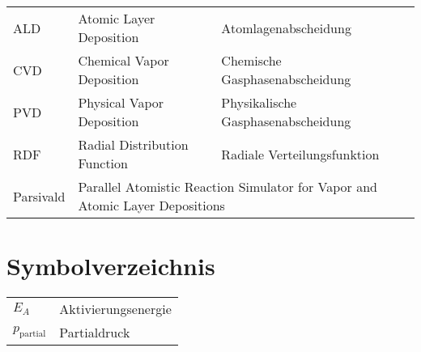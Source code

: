 \def\arraystretch{1.5}
\begin{tabularx}{\linewidth}{lll}
ALD	&	Atomic Layer Deposition	&	Atomlagenabscheidung	\\
CVD	&	Chemical Vapor Deposition	&	Chemische Gasphasenabscheidung	\\
PVD	&	Physical Vapor Deposition	&	Physikalische Gasphasenabscheidung	\\
RDF	&	Radial Distribution Function	&	Radiale Verteilungsfunktion	\\
Parsivald	&	\multicolumn{2}{X}{Parallel Atomistic Reaction Simulator for Vapor and Atomic Layer Depositions}	\\
\end{tabularx}

%
%


\chapter*{Symbolverzeichnis}
\def\listacronymname{Symbolverzeichnis}

\begin{tabularx}{\linewidth}{ll}
$E_A$ & Aktivierungsenergie \\
$p_\text{partial}$ & Partialdruck \\
\end{tabularx}


\cleardoublepage
{} %
